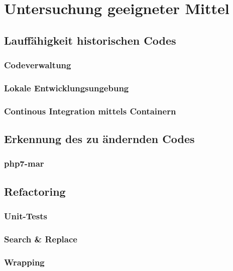 \chapter{Untersuchung geeigneter Mittel}\label{ch:tools} 

\section{Lauffähigkeit historischen Codes}
\subsection{Codeverwaltung}
\subsection{Lokale Entwicklungsungebung}
\subsection{Continous Integration mittels Containern}

\section{Erkennung des zu ändernden Codes}
\subsection{php7-mar}

\section{Refactoring}
\subsection{Unit-Tests}
\subsection{Search \& Replace}
\subsection{Wrapping}